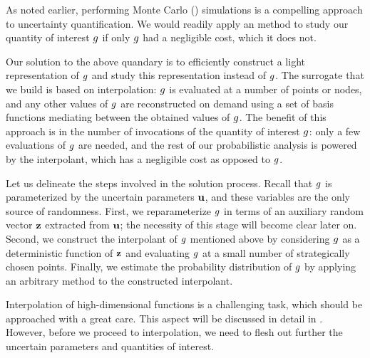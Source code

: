 As noted earlier, performing Monte Carlo () simulations is a compelling
approach to uncertainty quantification. We would readily apply an 
method to study our quantity of interest $g$ if only $g$ had a negligible
cost, which it does not.

Our solution to the above quandary is to efficiently construct a light
representation of $g$ and study this representation instead of $g$. The
surrogate that we build is based on interpolation: $g$ is evaluated at a number
of points or nodes, and any other values of $g$ are reconstructed on demand
using a set of basis functions mediating between the obtained values of $g$.
The benefit of this approach is in the number of invocations of the quantity of
interest $g$: only a few evaluations of $g$ are needed, and the rest of our
probabilistic analysis is powered by the interpolant, which has a negligible
cost as opposed to $g$.

Let us delineate the steps involved in the solution process. Recall that $g$ is
parameterized by the uncertain parameters $\mathbf{u}$, and these variables are the
only source of randomness. First, we reparameterize $g$ in terms of an
auxiliary random vector $\mathbf{z}$ extracted from $\mathbf{u}$; the necessity of this stage
will become clear later on. Second, we construct the interpolant of $g$
mentioned above by considering $g$ as a deterministic function of $\mathbf{z}$ and
evaluating $g$ at a small number of strategically chosen points. Finally, we
estimate the probability distribution of $g$ by applying an arbitrary 
method to the constructed interpolant.

Interpolation of high-dimensional functions is a challenging task, which should
be approached with a great care. This aspect will be discussed in detail in
. However, before we proceed to interpolation, we need to
flesh out further the uncertain parameters and quantities of interest.
